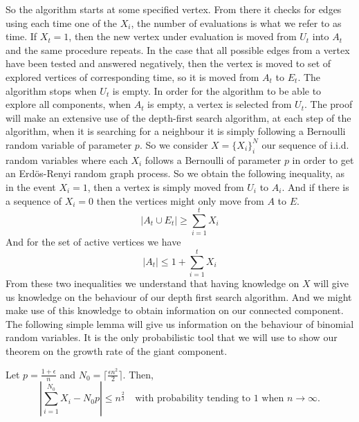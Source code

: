 So the algorithm starts at some specified vertex. From there it checks for edges using each time one of the $X_i$, the number of evaluations is what we refer to as time.
If $X_t = 1$, then the new vertex under evaluation is moved from $U_t$ into $A_t$ and the same procedure repeats. 
In the case that all possible edges from a vertex have been tested and answered negatively, then the vertex is moved to set of explored vertices of corresponding time, so it is moved from $A_t$ to $E_t$.
The algorithm stops when $U_t$ is empty.
\newline
In order for the algorithm to be able to explore all components, when $A_t$ is empty, a vertex is selected from $U_t$.
\newline
The proof will make an extensive use of the depth-first search algorithm, at each step of the algorithm, when it is searching for a neighbour it is simply following a Bernoulli random variable of parameter $p$.
So we consider $X = \{X_i\}_i^N$ our sequence of i.i.d. random variables where each $X_i$ follows a Bernoulli of parameter $p$ in order to get an Erd\"os-Renyi random graph process.
So we obtain the following inequality, as in the event $X_i = 1$, then a vertex is simply moved from $U_i$ to $A_i$. And if there is a sequence of $X_i = 0$ then the vertices might only move from $A$ to $E$.  
\begin{equation}
	|A_t \cup E_t| \geq \sum_{i=1}^t X_i
\end{equation} 
And for the set of active vertices we have
\begin{equation}\label{eq:At}
	|A_t| \leq 1 + \sum_{i=1}^t X_i
\end{equation}
From these two inequalities we understand that having knowledge on $X$ will give us knowledge on the behaviour of our depth first search algorithm. And we might make use of this knowledge to obtain information on our connected component.
\newline
The following simple lemma will give us information on the behaviour of binomial random variables. It is the only probabilistic tool that we will use to show our theorem on the growth rate of the giant component.
\begin{lemma}\label{lemmaN0}
	Let $p = \frac{1+\epsilon}{n}$ and $N_0 = \lceil\frac{\epsilon n^2}{2}\rceil$. Then, 
	\begin{equation}
	|\sum_{i=1}^{N_0} X_{i} - N_0 p| \leq n^{\frac{2}{3}} \quad \text{with probability tending to 1 when $n\to \infty$.}
	\end{equation}
\end{lemma}
